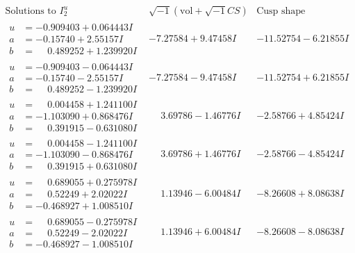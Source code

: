 \documentclass[1p]{elsarticle_modified}
\theoremstyle{definition}
\newcommand{\I}{\sqrt{-1}}
\begin{document}
$$\begin{array}{c|c|c}  
\text{Solutions to }I^u_{2}& \I (\text{vol} + \sqrt{-1}CS) & \text{Cusp shape}\\
 \hline 
\begin{aligned}
u &= -0.909403 + 0.064443 I \\
a &= -0.15740 + 2.55157 I \\
b &= \phantom{-}0.489252 + 1.239920 I\end{aligned}
 & -7.27584 + 9.47458 I & -11.52754 - 6.21855 I \\ \hline\begin{aligned}
u &= -0.909403 - 0.064443 I \\
a &= -0.15740 - 2.55157 I \\
b &= \phantom{-}0.489252 - 1.239920 I\end{aligned}
 & -7.27584 - 9.47458 I & -11.52754 + 6.21855 I \\ \hline\begin{aligned}
u &= \phantom{-}0.004458 + 1.241100 I \\
a &= -1.103090 + 0.868476 I \\
b &= \phantom{-}0.391915 - 0.631080 I\end{aligned}
 & \phantom{-}3.69786 - 1.46776 I & -2.58766 + 4.85424 I \\ \hline\begin{aligned}
u &= \phantom{-}0.004458 - 1.241100 I \\
a &= -1.103090 - 0.868476 I \\
b &= \phantom{-}0.391915 + 0.631080 I\end{aligned}
 & \phantom{-}3.69786 + 1.46776 I & -2.58766 - 4.85424 I \\ \hline\begin{aligned}
u &= \phantom{-}0.689055 + 0.275978 I \\
a &= \phantom{-}0.52249 + 2.02022 I \\
b &= -0.468927 + 1.008510 I\end{aligned}
 & \phantom{-}1.13946 - 6.00484 I & -8.26608 + 8.08638 I \\ \hline\begin{aligned}
u &= \phantom{-}0.689055 - 0.275978 I \\
a &= \phantom{-}0.52249 - 2.02022 I \\
b &= -0.468927 - 1.008510 I\end{aligned}
 & \phantom{-}1.13946 + 6.00484 I & -8.26608 - 8.08638 I \\ \hline\begin{aligned}

\end{aligned}
\end{array}$$
\end{document}
